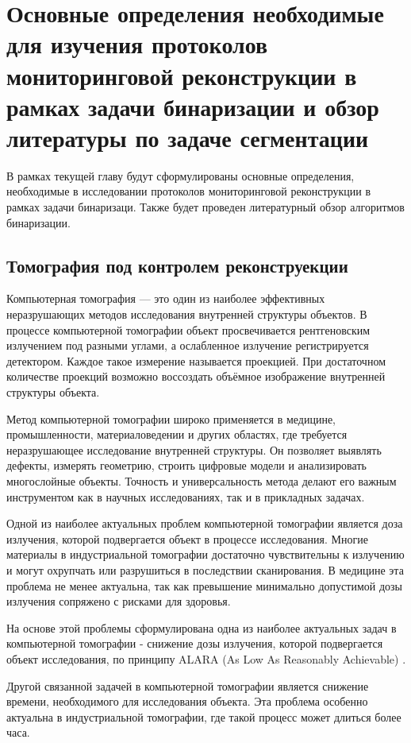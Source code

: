\section{Основные определения необходимые для изучения протоколов мониторинговой реконструкции в рамках задачи бинаризации и обзор литературы по задаче сегментации}

В рамках текущей главу будут сформулированы основные определения, необходимые в исследовании протоколов мониторинговой реконструкции в рамках задачи бинаризаци. Также будет проведен литературный обзор алгоритмов бинаризации.

\subsection{Томография под контролем реконструекции}

Компьютерная томография — это один из наиболее эффективных неразрушающих методов исследования внутренней структуры объектов.  В процессе компьютерной томографии объект просвечивается рентгеновским излучением под разными углами, а ослабленное излучение регистрируется детектором. Каждое такое измерение называется проекцией. При достаточном количестве проекций возможно воссоздать объёмное изображение внутренней структуры объекта.

Метод компьютерной томографии широко применяется в медицине, промышленности, материаловедении и других областях, где требуется неразрушающее исследование внутренней структуры. Он позволяет выявлять дефекты, измерять геометрию, строить цифровые модели и анализировать многослойные объекты. Точность и универсальность метода делают его важным инструментом как в научных исследованиях, так и в прикладных задачах.

Одной из наиболее актуальных проблем компьютерной томографии является доза излучения, которой подвергается объект в процессе исследования. Многие материалы в индустриальной томографии достаточно чувствительны к излучению и могут охрупчать или разрушиться в последствии сканирования. В медицине эта проблема не менее актуальна, так как превышение минимально допустимой дозы излучения сопряжено с рисками для здоровья.

На основе этой проблемы сформулирована одна из наиболее актуальных задач в компьютерной томографии - снижение дозы излучения, которой подвергается объект исследования, по принципу ALARA (As Low As Reasonably Achievable) \cite{slovis2002alara}.

Другой связанной задачей в компьютерной томографии является снижение времени, необходимого для исследования объекта. Эта проблема особенно актуальна в индустриальной томографии, где такой процесс может длиться более часа.

